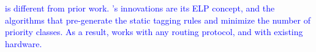 
\textcolor{blue}{
 \sysname{} is different from prior work. \sysname{}'s innovations are its ELP concept, and the algorithms that pre-generate the static tagging rules and minimize the number of priority classes. As a result, \sysname{} works with any routing protocol, and with existing hardware. }













%
%
%
%


